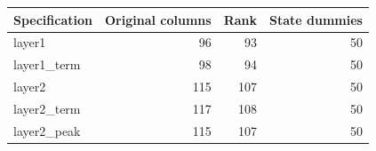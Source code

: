 \begingroup\small\setlength{\tabcolsep}{3pt}
\begin{tabularx}{\linewidth}{Xrrr}\toprule
Specification & Original columns & Rank & State dummies \\ \midrule
layer1 & 96 & 93 & 50 \\
layer1\_term & 98 & 94 & 50 \\
layer2 & 115 & 107 & 50 \\
layer2\_term & 117 & 108 & 50 \\
layer2\_peak & 115 & 107 & 50 \\
\bottomrule\end{tabularx}\endgroup
